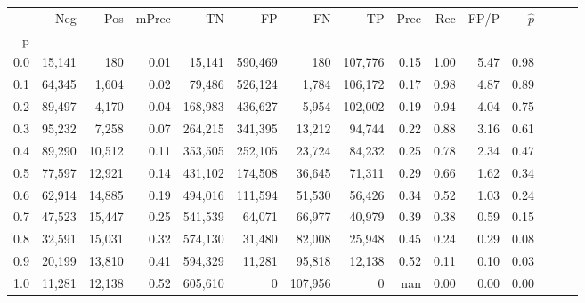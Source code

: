 \begin{tabular}{rrrrrrrrrrrrrrr}
\toprule
{} &     Neg &     Pos & mPrec &       TN &       FP &       FN &       TP &  Prec &   Rec &  FP/P & $\hat{p}$ \\
p   &         &         &       &          &          &          &          &       &       &       &           \\
\midrule
0.0 &  15,141 &     180 &  0.01 &   15,141 &  590,469 &      180 &  107,776 &  0.15 &  1.00 &  5.47 &      0.98 \\
0.1 &  64,345 &   1,604 &  0.02 &   79,486 &  526,124 &    1,784 &  106,172 &  0.17 &  0.98 &  4.87 &      0.89 \\
0.2 &  89,497 &   4,170 &  0.04 &  168,983 &  436,627 &    5,954 &  102,002 &  0.19 &  0.94 &  4.04 &      0.75 \\
0.3 &  95,232 &   7,258 &  0.07 &  264,215 &  341,395 &   13,212 &   94,744 &  0.22 &  0.88 &  3.16 &      0.61 \\
0.4 &  89,290 &  10,512 &  0.11 &  353,505 &  252,105 &   23,724 &   84,232 &  0.25 &  0.78 &  2.34 &      0.47 \\
0.5 &  77,597 &  12,921 &  0.14 &  431,102 &  174,508 &   36,645 &   71,311 &  0.29 &  0.66 &  1.62 &      0.34 \\
0.6 &  62,914 &  14,885 &  0.19 &  494,016 &  111,594 &   51,530 &   56,426 &  0.34 &  0.52 &  1.03 &      0.24 \\
0.7 &  47,523 &  15,447 &  0.25 &  541,539 &   64,071 &   66,977 &   40,979 &  0.39 &  0.38 &  0.59 &      0.15 \\
0.8 &  32,591 &  15,031 &  0.32 &  574,130 &   31,480 &   82,008 &   25,948 &  0.45 &  0.24 &  0.29 &      0.08 \\
0.9 &  20,199 &  13,810 &  0.41 &  594,329 &   11,281 &   95,818 &   12,138 &  0.52 &  0.11 &  0.10 &      0.03 \\
1.0 &  11,281 &  12,138 &  0.52 &  605,610 &        0 &  107,956 &        0 &   nan &  0.00 &  0.00 &      0.00 \\
\bottomrule
\end{tabular}
